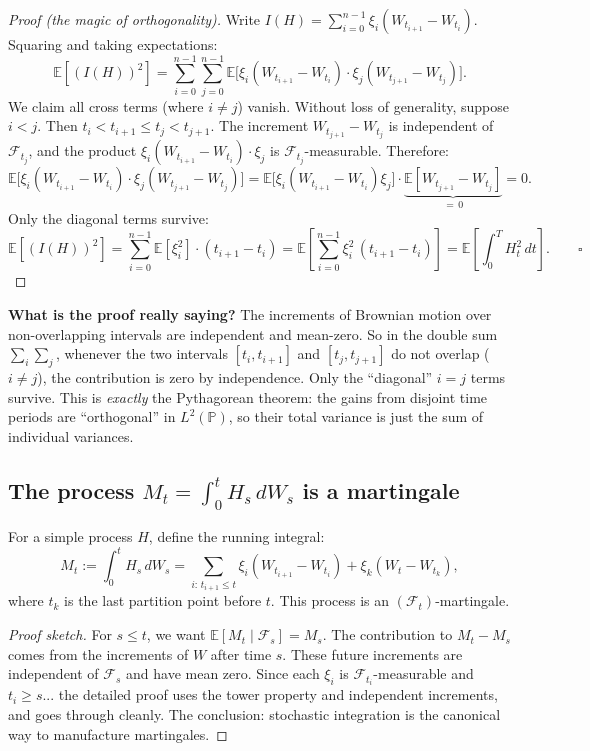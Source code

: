 \documentclass[11pt,a4paper]{article}
\theoremstyle{definition}
\theoremstyle{plain}
\theoremstyle{remark}
\newcommand{\E}{\mathbb{E}}
\newcommand{\Prob}{\mathbb{P}}
\newcommand{\F}{\mathcal{F}}
\begin{document}
\begin{proof}[Proof (the magic of orthogonality)]
Write $I(H) = \sum_{i=0}^{n-1} \xi_i(W_{t_{i+1}} - W_{t_i})$. Squaring and taking expectations:
\[
  \E\left[(I(H))^2\right] = \sum_{i=0}^{n-1}\sum_{j=0}^{n-1} \E\bigl[\xi_i(W_{t_{i+1}}-W_{t_i})\cdot \xi_j(W_{t_{j+1}}-W_{t_j})\bigr].
\]
We claim all cross terms (where $i \neq j$) vanish. Without loss of generality, suppose $i < j$. Then $t_i < t_{i+1} \leq t_j < t_{j+1}$. The increment $W_{t_{j+1}} - W_{t_j}$ is independent of $\F_{t_j}$, and the product $\xi_i(W_{t_{i+1}}-W_{t_i}) \cdot \xi_j$ is $\F_{t_j}$-measurable. Therefore:
\[
  \E\bigl[\xi_i(W_{t_{i+1}}-W_{t_i}) \cdot \xi_j(W_{t_{j+1}}-W_{t_j})\bigr] = \E\bigl[\xi_i(W_{t_{i+1}}-W_{t_i})\xi_j\bigr]\cdot \underbrace{\E[W_{t_{j+1}}-W_{t_j}]}_{=\,0} = 0.
\]
Only the diagonal terms survive:
\[
  \E[(I(H))^2] = \sum_{i=0}^{n-1} \E[\xi_i^2]\cdot(t_{i+1}-t_i) = \E\left[\sum_{i=0}^{n-1} \xi_i^2\,(t_{i+1}-t_i)\right] = \E\left[\int_0^T H_t^2\,dt\right]. \qquad \square
\]
\end{proof}

\begin{tutobox}
\textbf{What is the proof really saying?}
The increments of Brownian motion over non-overlapping intervals are independent and mean-zero. So in the double sum $\sum_i\sum_j$, whenever the two intervals $[t_i, t_{i+1}]$ and $[t_j, t_{j+1}]$ do not overlap ($i \neq j$), the contribution is zero by independence. Only the ``diagonal'' $i = j$ terms survive. This is \emph{exactly} the Pythagorean theorem: the gains from disjoint time periods are ``orthogonal'' in $L^2(\Prob)$, so their total variance is just the sum of individual variances.
\end{tutobox}

\subsection{The process $M_t = \int_0^t H_s\,dW_s$ is a martingale}

For a simple process $H$, define the running integral:
\[
  M_t := \int_0^t H_s\,dW_s = \sum_{i:\,t_{i+1}\leq t} \xi_i(W_{t_{i+1}}-W_{t_i}) + \xi_k(W_t - W_{t_k}),
\]
where $t_k$ is the last partition point before $t$. This process is an $(\F_t)$-martingale.

\begin{proof}[Proof sketch]
For $s \leq t$, we want $\E[M_t \mid \F_s] = M_s$. The contribution to $M_t - M_s$ comes from the increments of $W$ after time $s$. These future increments are independent of $\F_s$ and have mean zero. Since each $\xi_i$ is $\F_{t_i}$-measurable and $t_i \geq s$... the detailed proof uses the tower property and independent increments, and goes through cleanly. The conclusion: stochastic integration is the canonical way to manufacture martingales.
\end{proof}
\end{document}

